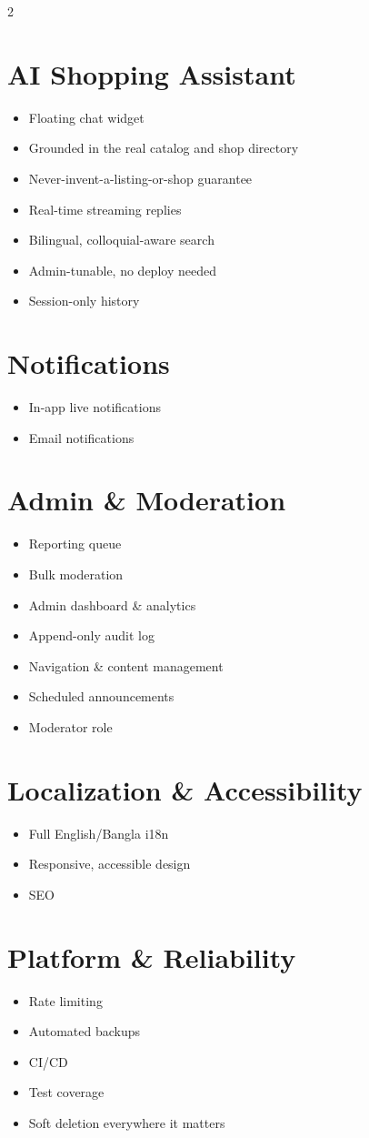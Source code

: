 \documentclass[11pt]{article}
\begin{document}
\begin{multicols}{2}
\section{AI Shopping Assistant}
\begin{itemize}
  \item Floating chat widget
  \item Grounded in the real catalog and shop directory
  \item Never-invent-a-listing-or-shop guarantee
  \item Real-time streaming replies
  \item Bilingual, colloquial-aware search
  \item Admin-tunable, no deploy needed
  \item Session-only history
\end{itemize}

\section{Notifications}
\begin{itemize}
  \item In-app live notifications
  \item Email notifications
\end{itemize}

\section{Admin \& Moderation}
\begin{itemize}
  \item Reporting queue
  \item Bulk moderation
  \item Admin dashboard \& analytics
  \item Append-only audit log
  \item Navigation \& content management
  \item Scheduled announcements
  \item Moderator role
\end{itemize}

\section{Localization \& Accessibility}
\begin{itemize}
  \item Full English/Bangla i18n
  \item Responsive, accessible design
  \item SEO
\end{itemize}

\section{Platform \& Reliability}
\begin{itemize}
  \item Rate limiting
  \item Automated backups
  \item CI/CD
  \item Test coverage
  \item Soft deletion everywhere it matters
\end{itemize}

\end{multicols}
\end{document}
